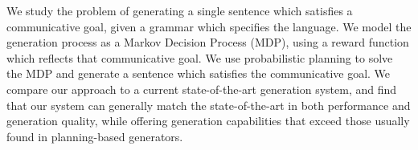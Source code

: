 %
%
%

\noindent       %
  We study the problem of generating a single sentence which satisfies
  a communicative goal, given a grammar which specifies the language.
  We model the generation process as a Markov Decision Process (MDP),
  using a reward function which reflects that communicative goal.  We use
  probabilistic planning to solve the MDP and generate a sentence which
  satisfies the communicative goal.  We compare our approach to a current
  state-of-the-art generation system, and find that our system can generally
  match the state-of-the-art in both performance and generation quality, while
  offering generation capabilities that exceed those usually found in planning-based
  generators.